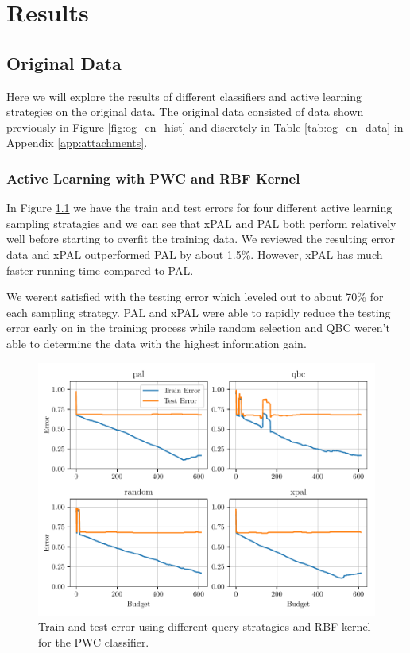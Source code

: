 \chapter{Results}

\section{Original Data}

Here we will explore the results of different classifiers and active learning strategies on the original data. The original data consisted of data shown previously in Figure \ref{fig:og_en_hist} and discretely in Table \ref{tab:og_en_data} in Appendix \ref{app:attachments}. 

\subsection{Active Learning with PWC and RBF Kernel}

In Figure \ref{fig:plot_all_results_rbf} we have the train and test errors for four different active learning sampling stratagies and we can see that xPAL and PAL both perform relatively well before starting to overfit the training data. We reviewed the resulting error data and xPAL outperformed PAL by about 1.5\%. However, xPAL has much faster running time compared to PAL. 

We werent satisfied with the testing error which leveled out to about 70\% for each sampling strategy. PAL and xPAL were able to rapidly reduce the testing error early on in the training process while random selection and QBC weren't able to determine the data with the highest information gain. 

\begin{figure}[ht]
  \centering
  \includegraphics[width=\textwidth]{../img/plot_all_results_rbf.pdf}
  \caption{Train and test error using different query stratagies and RBF kernel for the PWC classifier.}
  \label{fig:plot_all_results_rbf}
\end{figure}

